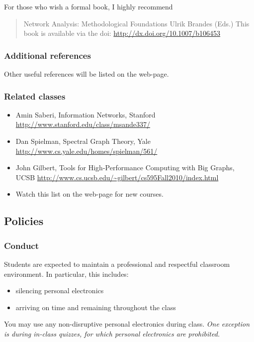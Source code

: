 \documentclass{article}
\begin{document}
For those who wish a formal book, I highly recommend

\begin{quote}%
Network Analysis: Methodological Foundations Ulrik Brandes (Eds.) This book is available via the doi: \url{http://dx.doi.org/10.1007/b106453}


\end{quote}
\hypertarget{additional_references_11}{}\subsubsection*{{Additional references}}\label{additional_references_11}

Other useful references will be listed on the web-page.

\hypertarget{related_classes_12}{}\subsubsection*{{Related classes}}\label{related_classes_12}

\begin{itemize}%
\item Amin Saberi, Information Networks, Stanford \url{http://www.stanford.edu/class/msande337/}
\item Dan Spielman, Spectral Graph Theory, Yale \url{http://www.cs.yale.edu/homes/spielman/561/}
\item John Gilbert, Tools for High-Performance Computing with Big Graphs, UCSB \url{http://www.cs.ucsb.edu/~gilbert/cs595Fall2010/index.html}
\item Watch this list on the web-page for new courses.

\end{itemize}
\hypertarget{policies_13}{}\subsection*{{Policies}}\label{policies_13}

\hypertarget{conduct_14}{}\subsubsection*{{Conduct}}\label{conduct_14}

Students are expected to maintain a professional and respectful classroom environment. In particular, this includes:

\begin{itemize}%
\item silencing personal electronics
\item arriving on time and remaining throughout the class

\end{itemize}
You may use any non-disruptive personal electronics during class. \emph{One exception is during in-class quizzes, for which personal electronics are prohibited.}
\end{document}
